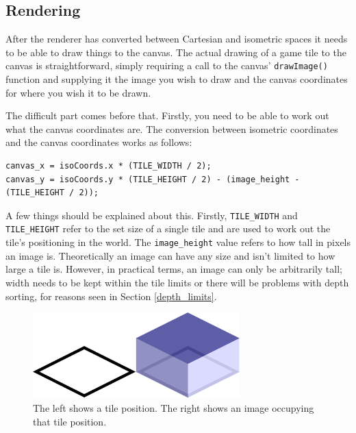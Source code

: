 \subsection{Rendering}
After the renderer has converted between Cartesian and isometric spaces it needs to be able to draw things to the canvas. The actual drawing of a game tile to the canvas is straightforward, simply requiring a call to the canvas' \texttt{drawImage()} function and supplying it the image you wish to draw and the canvas coordinates for where you wish it to be drawn.

The difficult part comes before that. Firstly, you need to be able to work out what the canvas coordinates are. The conversion between isometric coordinates and the canvas coordinates works as follows:

\noindent
\begin{minipage}{\linewidth}
\begin{lstlisting}[style=js, caption={Conversion between isometric coordinates and canvas coordinates.}, label=isometric_to_canvas]
canvas_x = isoCoords.x * (TILE_WIDTH / 2);
canvas_y = isoCoords.y * (TILE_HEIGHT / 2) - (image_height - (TILE_HEIGHT / 2));
\end{lstlisting}
\end{minipage}

A few things should be explained about this. Firstly, \texttt{TILE\_WIDTH} and \texttt{TILE\_HEIGHT} refer to the set size of a single tile and are used to work out the tile's positioning in the world. The \texttt{image\_height} value refers to how tall in pixels an image is. Theoretically an image can have any size and isn't limited to how large a tile is. However, in practical terms, an image can only be arbitrarily tall; width needs to be kept within the tile limits or there will be problems with depth sorting, for reasons seen in Section \ref{depth_limits}.

\begin{figure}[H]
    \centering
    \includegraphics[width=8cm]{Images/tile_and_image.eps}
    \caption{The left shows a tile position. The right shows an image occupying that tile position.}
    \label{fig:tile_and_image}
\end{figure}

